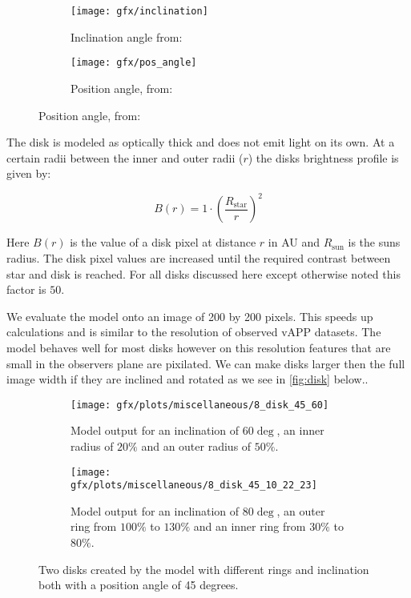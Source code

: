 \begin{figure}[h!]
  \centering
  \begin{subfigure}[b]{0.4\textwidth}
    \texttt{[image: gfx/inclination]}
    \caption{Inclination angle from: \cite{Pieter_Okko}}
    \label{fig:pos_angle}

  \end{subfigure}
  \begin{subfigure}[b]{0.4\textwidth}
    \texttt{[image: gfx/pos\_angle]}
    \caption{Position angle, from: \cite{Pieter_Okko}}
    \label{fig:inclination}
  \end{subfigure}
  \label{fig:1}
\end{figure}

The disk is modeled as optically thick and does not emit light on its own. At a certain radii between the inner and outer radii ($r$) the disks brightness profile is given by:

\begin{equation}
B(r) = 1 \cdot {\left(\frac{R_{\text{star}}}{r}\right)}^2
\end{equation}

Here $B(r)$ is the value of a disk pixel at distance $r$ in AU and $R_\text{sun}$ is the suns radius. The disk pixel values are increased until the required contrast between star and disk is reached. For all disks discussed here except otherwise noted this factor is $50$.

We evaluate the model onto an image of 200 by 200 pixels. This speeds up calculations and is similar to the resolution of observed \ac{vAPP} datasets. The model behaves well for most disks however on this resolution features that are small in the observers plane are pixilated. We can make disks larger then the full image width if they are inclined and rotated as we see in \autoref{fig:disk} below..

\begin{figure}[h!]
  \begin{subfigure}[t]{0.5\textwidth}
    \texttt{[image: gfx/plots/miscellaneous/8\_disk\_45\_60]}
    \caption{Model output for an inclination of $60\deg$, an inner radius of $20\%$ and an outer radius of $50\%$.}
  \end{subfigure}
  \begin{subfigure}[t]{0.5\textwidth}
    \texttt{[image: gfx/plots/miscellaneous/8\_disk\_45\_10\_22\_23]}
    \caption{Model output for an inclination of $80\deg$, an outer ring from $100\%$ to $130\%$ and an inner ring from $30\%$ to $80\%$.}
  \end{subfigure}
  \caption{Two disks created by the model with different rings and inclination both with a position angle of 45 degrees.}
  \label{fig:disk}
\end{figure}

